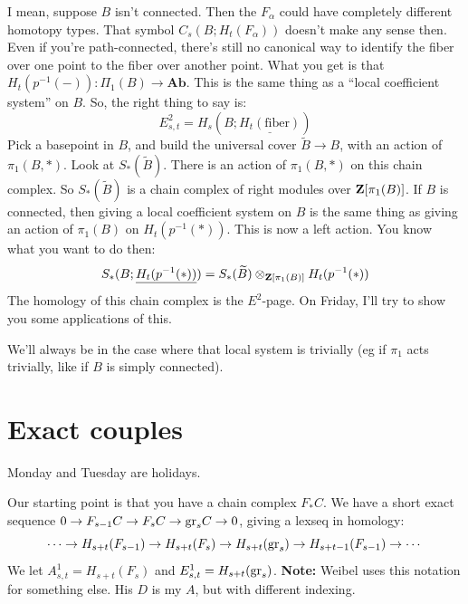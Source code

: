 I mean, suppose $B$ isn't connected.
Then the $F_\alpha$ could have completely different homotopy types.
That symbol $C_s(B;H_t(F_\alpha))$ doesn't make any sense then.
Even if you're path-connected, there's still no canonical way to identify the fiber over one point to the fiber over another point.
What you get is that $H_t(p^{-1}(-)):\Pi_1(B) \to \mathbf{Ab}$.
This is the same thing as a ``local coefficient system'' on $B$.
So, the right thing to say is:
$$
E^2_{s,t} = H_s(B;\underline{H_t(\mathrm{fiber})})
$$
Pick a basepoint in $B$, and build the universal cover $\widetilde{B}\to B$, with an action of $\pi_1(B,\ast)$.
Look at $S_\ast(\widetilde{B})$.
There is an action of $\pi_1(B,\ast)$ on this chain complex.
So $S_\ast(\widetilde{B})$ is a chain complex of right modules over $\mathbf Z[\pi_1(B)]$.
If $B$ is connected, then giving a local coefficient system on $B$ is the same thing as giving an action of $\pi_1(B)$ on $H_t(p^{-1}(\ast))$.
This is now a left action.
You know what you want to do then:
$$
S_\ast(B;\underline{H_t(p^{-1}(\ast))}) = S_\ast(\widetilde{B}) \otimes_{\mathbf Z[\pi_1(B)]} H_t(p^{-1}(\ast))
$$
The homology of this chain complex is the $E^2$-page.
On Friday, I'll try to show you some applications of this.

We'll always be in the case where that local system is trivially (eg if $\pi_1$ acts trivially, like if $B$ is simply connected).
\section{Exact couples}
Monday and Tuesday are holidays.

Our starting point is that you have a chain complex $F_\ast C$.
We have a short exact sequence $0\to F_{s-1} C\to F_s C \to \mathrm{gr}_s C \to 0$, giving a lexseq in homology:
$$
\cdots\to H_{s+t}(F_{s-1}) \to H_{s+t}(F_s) \to H_{s+t}(\mathrm{gr}_s) \to H_{s+t-1}(F_{s-1}) \to \cdots
$$
We let $A^1_{s,t} = H_{s+t}(F_{s})$ and $E^1_{s,t} = H_{s+t}(\mathrm{gr}_s)$.
\textbf{Note: }Weibel uses this notation for something else.
His $D$ is my $A$, but with different indexing.

